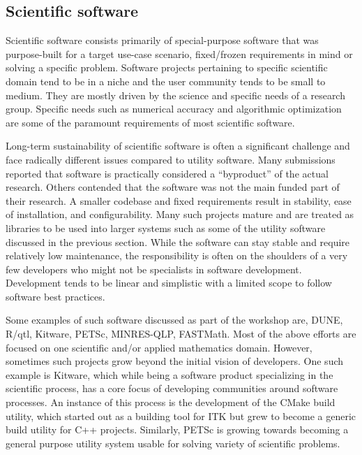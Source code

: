 \documentclass[11pt, oneside]{amsart}
\newcommand{\toolname}[1] {\textsf{#1}}
\begin{document}
\subsection{Scientific software}
Scientific software consists primarily of special-purpose software that was
purpose-built for a target use-case scenario,  fixed/frozen requirements in
mind or solving a specific problem. Software projects pertaining to specific
scientific domain tend to be in a niche and the user community tends to be
small to medium. They are mostly driven by the science and specific needs of a
research group. Specific needs such as numerical accuracy and
algorithmic optimization are some of the paramount requirements of most
scientific software.

Long-term sustainability of scientific software is often a significant
challenge and face radically different issues compared to utility software.
Many submissions reported that software is practically considered a ``byproduct''
of the actual research. Others contended that the software was not the main
funded part of their research. A smaller codebase and fixed requirements result
in stability, ease of installation, and configurability.  Many such projects
mature and are treated as libraries to be used into larger systems such as some
of the utility software discussed in the previous section. While the software
can stay stable and require relatively low maintenance, the responsibility is
often on the shoulders of a very few developers who might not be specialists in
software development. Development tends to be linear and simplistic with a
limited scope to follow software best practices.

Some examples of such software discussed as part of the workshop are,
\toolname{DUNE}, \toolname{R/qtl}, \toolname{Kitware}, \toolname{PETSc}, \toolname{MINRES-QLP},
\toolname{FASTMath}.  Most of the above efforts are focused on one scientific
and/or applied mathematics domain. However, sometimes such projects grow beyond
the initial vision of developers. One such example is \toolname{Kitware}, which
while being a software product specializing in the scientific process, has a
core focus of developing communities around software processes. An instance of
this process is the development of the \toolname{CMake} build utility, which
started out as a building tool for \toolname{ITK} but grew to become a generic
build utility for C++ projects. Similarly, \toolname{PETSc} is growing towards
becoming a general purpose utility system usable for solving variety of
scientific problems.
\end{document}
